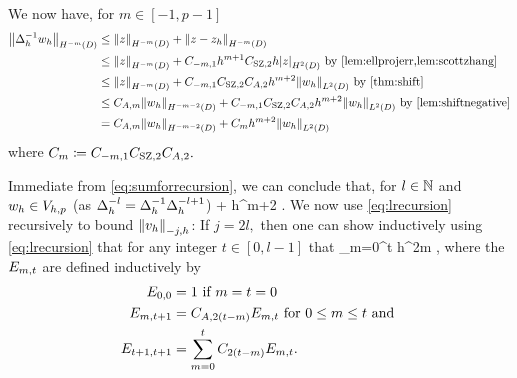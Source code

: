 We now have, for $m \in [-1,p-1]$
\begin{align}
\NHmmD{\DeltahI \wh} &\leq \NHmmD{z} + \NHmmD{z-\zh}\nonumber\\
&\leq \NHmmD{z} + \Cmmo h^{m+1} \Cinterpt h \SNHtD{z} \text{ by \cref{lem:ellprojerr,lem:scottzhang}}\nonumber\\
&\leq \NHmmD{z} + \Cmmo \Cinterpt \CAt h^{m+2} \NLtD{\wh} \text{ by \cref{thm:shift}}\nonumber\\
&\leq \CAm \NHmmmtD{\wh} + \Cmmo \Cinterpt \CAt h^{m+2} \NLtD{\wh} \text{ by \cref{lem:shiftnegative}}\nonumber\\
&= \CAm \NHmmmtD{\wh} + \Cm h^{m+2} \NLtD{\wh}\label{eq:sumforrecursion}
\end{align}
where $C_{m} \coloneqq C_{-m,1} C_{\mathrm{SZ},2} C_{A,2}.$

Immediate from \cref{eq:sumforrecursion}, we can conclude that, for $l \in \mathbb N$ and $w_{h} \in V_{h,p}$ (as $\Delta_{h}^{-l} = \Delta_{h}^{-1} \Delta_{h}^{-l+1}$)
\beq\label{eq:lrecursion}
\NHmmD{\Deltahml \vh} \leq \CAm \NHmmmtD{\Deltahmlpo \vh} + \Cm h^{m+2} \NLtD{\Deltahmlpo \vh}.
\eeq
We now use \cref{eq:lrecursion} recursively to bound $\Nmjh{\vh}$:
If $j = 2l,$ then one can show inductively using \cref{eq:lrecursion} that for any integer $t \in [0,l-1]$ that
\beq\label{eq:evenrecursivesum}
 \leq \sum_{m=0}^t h^{2m}  ,
\eeq
where the $E_{m,t}$ are defined inductively by
\begin{align}
\label{eq:Emt1}E_{0,0} &= 1 \text{ if } m=t=0\\
\label{eq:Emt2}E_{m,t+1} &= C_{A,2(t-m)} E_{m,t} \text{ for } 0 \leq m \leq t \text{ and }\\
\label{eq:Emt3}E_{t+1,t+1} &= \sum_{m=0}^t C_{2(t-m)} E_{m,t}.
\end{align}

